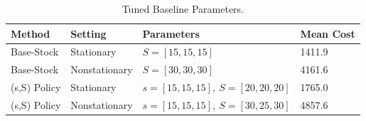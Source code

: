 \begin{table}[ht]
\centering
\caption{Tuned Baseline Parameters.}
\label{tab:baseline_params}
\begin{tabular}{llll}
\toprule
Method & Setting & Parameters & Mean Cost \\
\midrule
Base-Stock & Stationary & $S=[15, 15, 15]$ & 1411.9 \\
Base-Stock & Nonstationary & $S=[30, 30, 30]$ & 4161.6 \\
(s,S) Policy & Stationary & $s=[15, 15, 15],\ S=[20, 20, 20]$ & 1765.0 \\
(s,S) Policy & Nonstationary & $s=[15, 15, 15],\ S=[30, 25, 30]$ & 4857.6 \\
\bottomrule
\end{tabular}
\end{table}
